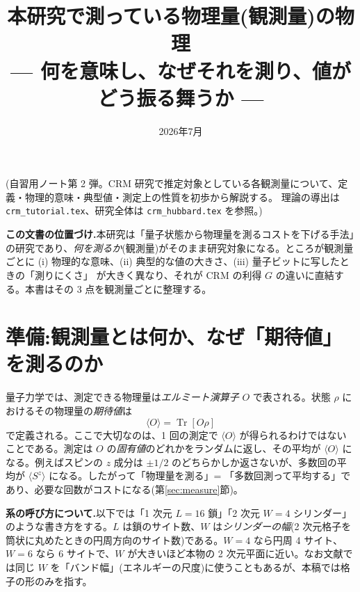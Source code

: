 \documentclass[11pt,a4paper]{ltjsarticle}
\title{\bfseries 本研究で測っている物理量(観測量)の物理\\[3pt]
\large — 何を意味し、なぜそれを測り、値がどう振る舞うか —}
\author{}
\date{2026年7月}
\newcommand{\ev}[1]{\langle #1\rangle}
\newcommand{\Tr}{\operatorname{Tr}}
\begin{document}
\maketitle
\vspace{-2.0em}
\begin{center}\small
(自習用ノート第 2 弾。CRM 研究で推定対象としている各観測量について、定義・物理的意味・典型値・測定上の性質を初歩から解説する。
理論の導出は \texttt{crm\_tutorial.tex}、研究全体は \texttt{crm\_hubbard.tex} を参照。)
\end{center}

\tableofcontents

\begin{keybox}
\textbf{この文書の位置づけ.}本研究は「量子状態から物理量を測るコストを下げる手法」の研究であり、\emph{何を測るか}(観測量)がそのまま研究対象になる。ところが観測量ごとに
(i) 物理的な意味、(ii) 典型的な値の大きさ、(iii) 量子ビットに写したときの「測りにくさ」
が大きく異なり、それが CRM の利得 $G$ の違いに直結する。本書はその 3 点を観測量ごとに整理する。
\end{keybox}

\section{準備:観測量とは何か、なぜ「期待値」を測るのか}

量子力学では、測定できる物理量は\emph{エルミート演算子} $O$ で表される。状態 $\rho$ におけるその物理量の\emph{期待値}は
\begin{equation}
  \ev{O} = \Tr[O\rho]
\end{equation}
で定義される。ここで大切なのは、1 回の測定で $\ev{O}$ が得られるわけではないことである。測定は $O$ の\emph{固有値}のどれかをランダムに返し、その平均が $\ev{O}$ になる。例えばスピンの $z$ 成分は $\pm1/2$ のどちらかしか返さないが、多数回の平均が $\ev{S^z}$ になる。したがって「物理量を測る」= 「多数回測って平均する」であり、必要な回数がコストになる(第\ref{sec:measure}節)。

\begin{keybox}
\textbf{系の呼び方について.}以下では「1 次元 $L=16$ 鎖」「2 次元 $W=4$ シリンダー」のような書き方をする。$L$ は鎖のサイト数、$W$ は\emph{シリンダーの幅}(2 次元格子を筒状に丸めたときの円周方向のサイト数)である。$W=4$ なら円周 4 サイト、$W=6$ なら 6 サイトで、$W$ が大きいほど本物の 2 次元平面に近い。なお文献では同じ $W$ を「バンド幅」(エネルギーの尺度)に使うこともあるが、本稿では格子の形のみを指す。
\end{keybox}
\end{document}
